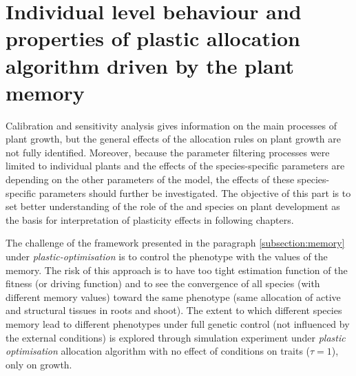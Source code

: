 



\section{Individual level behaviour and properties of plastic allocation algorithm driven by the plant memory}


Calibration and sensitivity analysis gives information on the main processes of plant growth, but the general effects of the allocation rules on plant growth are not fully identified. Moreover, because the parameter filtering processes were limited to individual plants and the effects of the species-specific parameters are depending on the other parameters of the model, the effects of these species-specific parameters should further be investigated. The objective of this part is to set better understanding of the role of the  and species  on plant development as the basis for interpretation of plasticity effects in following chapters.

The challenge of the framework presented in the paragraph \ref{subsection:memory} under \textit{plastic-optimisation} is to control the phenotype with the values of the memory. The risk of this approach is to have too tight estimation function of the fitness (or driving function) and to see the convergence of all species (with different memory values) toward the same phenotype (same allocation of active and structural tissues in roots and shoot). The extent to which different species memory lead to different phenotypes under full genetic control (not influenced by the external conditions) is explored through simulation experiment under \textit{plastic optimisation} allocation algorithm with no effect of conditions on traits ($\tau = 1$), only on growth.

